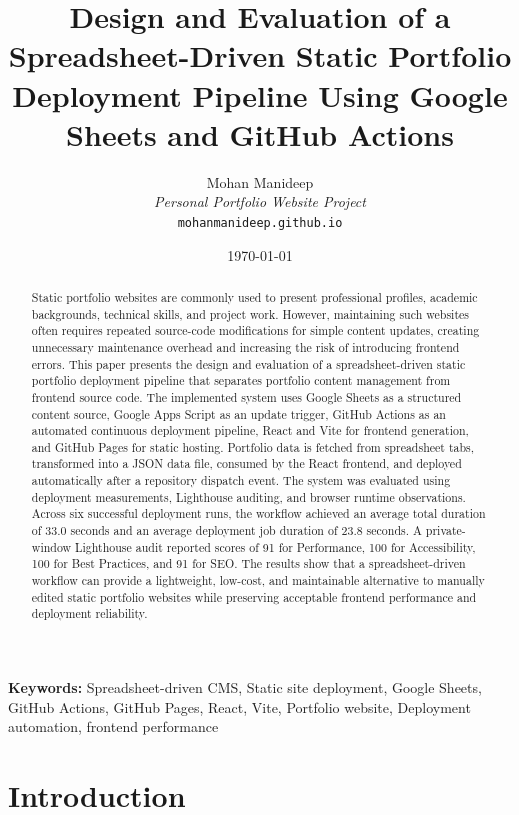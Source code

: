 \documentclass[10pt,a4paper,twocolumn]{article}
\title{\textbf{Design and Evaluation of a Spreadsheet-Driven Static Portfolio Deployment Pipeline Using Google Sheets and GitHub Actions}}
\author{
Mohan Manideep\\
\textit{Personal Portfolio Website Project}\\
\texttt{mohanmanideep.github.io}
}
\date{\today}
\begin{document}
\maketitle

\begin{abstract}
Static portfolio websites are commonly used to present professional profiles, academic backgrounds, technical skills, and project work. However, maintaining such websites often requires repeated source-code modifications for simple content updates, creating unnecessary maintenance overhead and increasing the risk of introducing frontend errors. This paper presents the design and evaluation of a spreadsheet-driven static portfolio deployment pipeline that separates portfolio content management from frontend source code. The implemented system uses Google Sheets as a structured content source, Google Apps Script as an update trigger, GitHub Actions as an automated continuous deployment pipeline, React and Vite for frontend generation, and GitHub Pages for static hosting. Portfolio data is fetched from spreadsheet tabs, transformed into a JSON data file, consumed by the React frontend, and deployed automatically after a repository dispatch event. The system was evaluated using deployment measurements, Lighthouse auditing, and browser runtime observations. Across six successful deployment runs, the workflow achieved an average total duration of 33.0 seconds and an average deployment job duration of 23.8 seconds. A private-window Lighthouse audit reported scores of 91 for Performance, 100 for Accessibility, 100 for Best Practices, and 91 for SEO. The results show that a spreadsheet-driven workflow can provide a lightweight, low-cost, and maintainable alternative to manually edited static portfolio websites while preserving acceptable frontend performance and deployment reliability.
\end{abstract}

\noindent\textbf{Keywords:} Spreadsheet-driven CMS, Static site deployment, Google Sheets, GitHub Actions, GitHub Pages, React, Vite, Portfolio website, Deployment automation, frontend performance

\section{Introduction}
\end{document}
